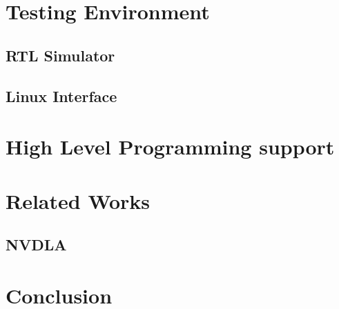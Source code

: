 \documentclass[12pt,conference]{IEEEtran}
\begin{document}
\section{Testing Environment}
\blindtext
\subsection{RTL Simulator}
\blindtext
\subsection{Linux Interface}
\blindtext

\section{High Level Programming support}
\blindtext

\section{Related Works}
\blindtext
\subsection{NVDLA}
\blindtext

\section{Conclusion}
\blindtext

\blindtext











\end{document}
